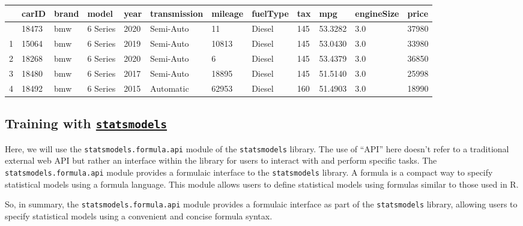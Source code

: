 \documentclass[
  letterpaper,
  DIV=11,
  numbers=noendperiod]{scrreprt}
\begin{document}
\begin{longtable}[]{@{}llllllllllll@{}}
\toprule\noalign{}
& carID & brand & model & year & transmission & mileage & fuelType & tax
& mpg & engineSize & price \\
\midrule\noalign{}
\endhead
\bottomrule\noalign{}
\endlastfoot
0 & 18473 & bmw & 6 Series & 2020 & Semi-Auto & 11 & Diesel & 145 &
53.3282 & 3.0 & 37980 \\
1 & 15064 & bmw & 6 Series & 2019 & Semi-Auto & 10813 & Diesel & 145 &
53.0430 & 3.0 & 33980 \\
2 & 18268 & bmw & 6 Series & 2020 & Semi-Auto & 6 & Diesel & 145 &
53.4379 & 3.0 & 36850 \\
3 & 18480 & bmw & 6 Series & 2017 & Semi-Auto & 18895 & Diesel & 145 &
51.5140 & 3.0 & 25998 \\
4 & 18492 & bmw & 6 Series & 2015 & Automatic & 62953 & Diesel & 160 &
51.4903 & 3.0 & 18990 \\
\end{longtable}

\subsection{\texorpdfstring{Training with
\href{https://www.statsmodels.org/stable/index.html}{\texttt{statsmodels}}}{Training with statsmodels}}\label{training-with-statsmodels}

Here, we will use the \texttt{statsmodels.formula.api} module of the
\texttt{statsmodels} library. The use of ``API'' here doesn't refer to a
traditional external web API but rather an interface within the library
for users to interact with and perform specific tasks. The
\texttt{statsmodels.formula.api} module provides a formulaic interface
to the \texttt{statsmodels} library. A formula is a compact way to
specify statistical models using a formula language. This module allows
users to define statistical models using formulas similar to those used
in R.

So, in summary, the \texttt{statsmodels.formula.api} module provides a
formulaic interface as part of the \texttt{statsmodels} library,
allowing users to specify statistical models using a convenient and
concise formula syntax.
\end{document}
